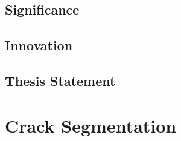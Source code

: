 \documentclass[a4paper,12pt]{report}
\begin{document}
\section{Significance}


\section{Innovation}

\section{Thesis Statement}

\chapter{Crack Segmentation}
\end{document}
